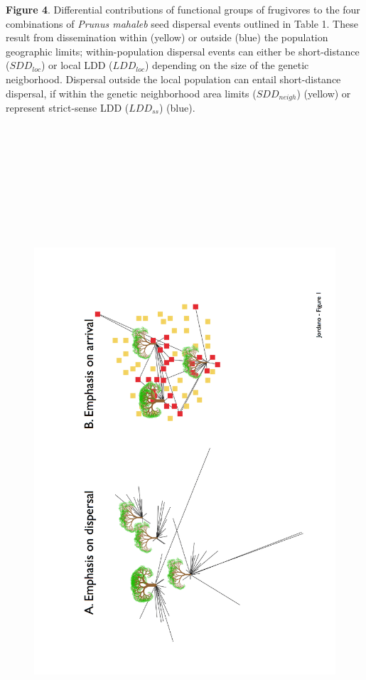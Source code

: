 \documentclass[a4paper, 12pt]{article}
\begin{document}
\begin{linenumbers}
\textbf{Figure 4}. Differential contributions of functional groups of frugivores to the four combinations of \textit{Prunus mahaleb} seed dispersal events outlined in Table 1. These result from dissemination within (yellow) or outside (blue) the population geographic limits; within-population dispersal events can either be short-distance ($SDD_{loc}$) or local LDD ($LDD_{loc}$) depending on the size of the genetic neigborhood. Dispersal outside the local population can entail short-distance dispersal, if within the genetic neighborhood area limits ($SDD_{neigh}$) (yellow) or represent strict-sense LDD ($LDD_{ss}$) (blue).\\ 
\newpage

\pagestyle{empty}
\begin{figure}[htbp]
\centerline{\includegraphics[height=25cm]{Fig1.pdf}}
%
\end{figure}


\end{linenumbers}
\end{document}
